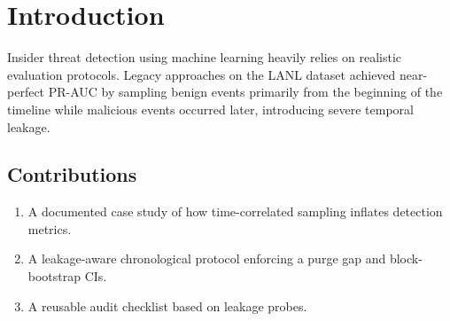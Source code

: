 \section{Introduction}
Insider threat detection using machine learning heavily relies on realistic evaluation protocols. Legacy approaches on the LANL dataset achieved near-perfect PR-AUC by sampling benign events primarily from the beginning of the timeline while malicious events occurred later, introducing severe temporal leakage.

\subsection{Contributions}
\begin{enumerate}
    \item A documented case study of how time-correlated sampling inflates detection metrics.
    \item A leakage-aware chronological protocol enforcing a purge gap and block-bootstrap CIs.
    \item A reusable audit checklist based on leakage probes.
\end{enumerate}
